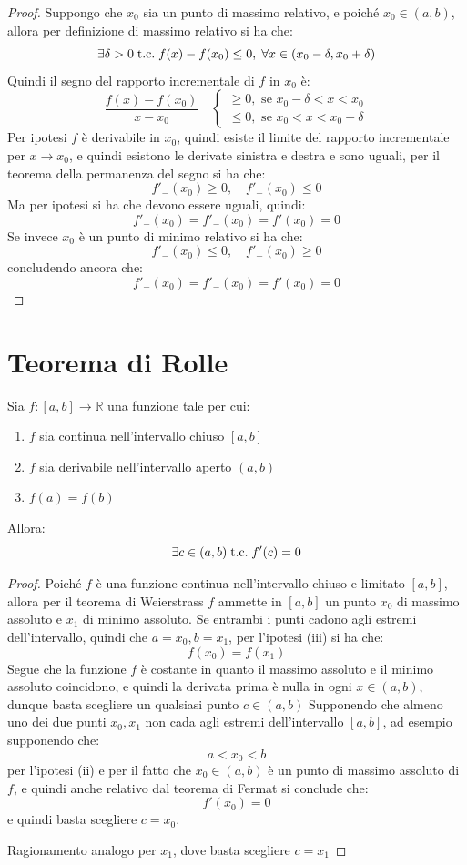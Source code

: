 \documentclass[a4paper,12pt,openright]{book}
\begin{document}
	\begin{proof}
		Suppongo che $x_0$ sia un punto di massimo relativo, e poiché $x_0 \in (a, b)$, allora per definizione di massimo relativo si ha che:
		\[\exists \delta > 0 \;\text{t.c.}\; f(x) - f(x_0) \leq 0, \; \forall x \in (x_0 - \delta, x_0 + \delta)\]
		Quindi il segno del rapporto incrementale di $f$ in $x_0$ è:
		\[\frac{f(x) - f(x_0)}{x - x_0} \quad \begin{cases}
			\geq 0, \text{ se } x_0 - \delta < x < x_0 \\
			\leq 0, \text{ se } x_0 < x < x_0 + \delta
		\end{cases}
		\]
		Per ipotesi $f$ è derivabile in $x_0$, quindi esiste il limite del rapporto incrementale per $x \rightarrow x_0$, e quindi esistono le derivate sinistra e destra e sono uguali, per il teorema della permanenza del segno si ha che:
		\[f'_-(x_0) \geq 0, \quad f'_-(x_0) \leq 0\]
		Ma per ipotesi si ha che devono essere uguali, quindi:
		\[f'_-(x_0) = f'_-(x_0) = f'(x_0) = 0\]
		Se invece $x_0$ è un punto di minimo relativo si ha che:
		\[f'_-(x_0) \leq 0, \quad f'_-(x_0) \geq 0\]
		concludendo ancora che:
		\[f'_-(x_0) = f'_-(x_0) = f'(x_0) = 0\]
	\end{proof}
	
	\section{Teorema di Rolle}
	Sia $f: [a, b] \longrightarrow \mathbb{R}$ una funzione tale per cui:
	\begin{enumerate}[label=\roman*)]
		\item $f$ sia continua nell'intervallo chiuso $[a, b]$
		\item $f$ sia derivabile nell'intervallo aperto $(a, b)$
		\item $f(a) = f(b)$
	\end{enumerate}
	Allora:
	\[\exists c \in (a, b) \;\text{t.c.}\; f'(c) = 0\]
	
	\begin{proof}
		Poiché $f$ è una funzione continua nell'intervallo chiuso e limitato $[a, b]$, allora per il teorema di Weierstrass $f$ ammette in $[a, b]$ un punto $x_0$ di massimo assoluto e $x_1$ di minimo assoluto.
		Se entrambi i punti cadono agli estremi dell'intervallo, quindi che $a = x_0, b = x_1$, per l'ipotesi (iii) si ha che:
		\[f(x_0) = f(x_1)\]
		Segue che la funzione $f$ è costante in quanto il massimo assoluto e il minimo assoluto coincidono, e quindi la derivata prima è nulla in ogni $x \in (a, b)$, dunque basta scegliere un qualsiasi punto $c \in (a, b)$
		Supponendo che almeno uno dei due punti $x_0, x_1$ non cada agli estremi dell'intervallo $[a, b]$, ad esempio supponendo che:
		\[a < x_0 < b\]
		per l'ipotesi (ii) e per il fatto che $x_0 \in (a, b)$ è un punto di massimo assoluto di $f$, e quindi anche relativo dal teorema di Fermat si conclude che:
		\[f'(x_0) = 0\]
		e quindi basta scegliere $c = x_0$.
		
		Ragionamento analogo per $x_1$, dove basta scegliere $c = x_1$
	\end{proof}
	
\end{document}
